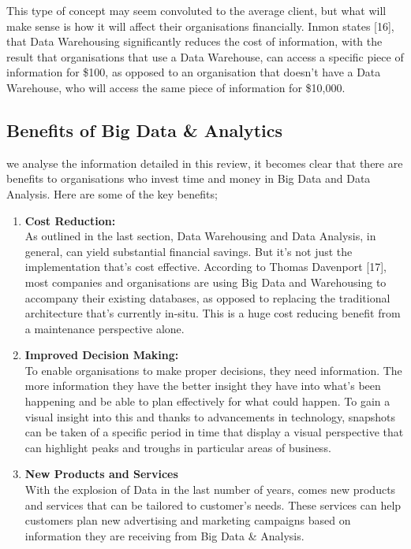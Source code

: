 \documentclass[10pt,journal,compsoc]{IEEEtran}
\begin{document}
This type of concept may seem convoluted to the average client, but what will make sense is how it will affect their organisations financially. Inmon states [16], that Data Warehousing significantly reduces the cost of information, with the result that organisations that use a Data Warehouse, can access a specific piece of information for \$100, as opposed to an organisation that doesn't have a Data Warehouse, who will access the same piece of information for \$10,000.

\subsection{Benefits of Big Data \& Analytics}
 we analyse the information detailed in this review, it becomes clear that there are benefits to organisations who invest time and money in Big Data and Data Analysis. Here are some of the key benefits;

\begin{enumerate}
	\item \textbf{Cost Reduction:}\\ As outlined in the last section, Data Warehousing and Data Analysis, in general, can yield substantial financial savings. But it's not just the implementation that's cost effective. According to Thomas Davenport [17], most companies and organisations are using Big Data and Warehousing to accompany their existing databases, as opposed to replacing the traditional architecture that's currently in-situ. This is a huge cost reducing benefit from a maintenance perspective alone. \\
	
	\item \textbf{Improved Decision Making:}\\ To enable organisations to make proper decisions, they need information. The more information they have the better insight they have into what's been happening and be able to plan effectively for what could happen. To gain a visual insight into this and thanks to advancements in technology, snapshots can be taken of a specific period in time that display a visual perspective that can highlight peaks and troughs in particular areas of business. \\
	
	\item \textbf{New Products and Services}\\With the explosion of Data in the last number of years, comes new products and services that can be tailored to customer’s needs. These services can help customers plan new advertising and marketing campaigns based on information they are receiving from Big Data \& Analysis. 
	 
\end{enumerate}
\end{document}

